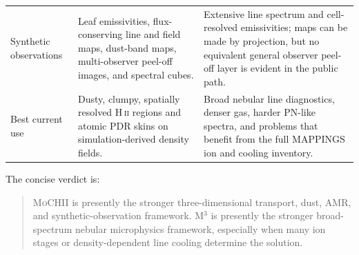 \documentclass[english,a4paper]{my_memo}
\newcommand{\MoCHII}{\textsc{MoCHII}}
\newcommand{\Mthree}{M$^3$}
\begin{document}
\begin{longtable}{P{0.19\textwidth}P{0.35\textwidth}P{0.35\textwidth}}
Synthetic observations & Leaf emissivities, flux-conserving line and field
maps, dust-band maps, multi-observer peel-off images, and spectral cubes. &
Extensive line spectrum and cell-resolved emissivities; maps can be made by
projection, but no equivalent general observer peel-off layer is evident in
the public path. \\

Best current use & Dusty, clumpy, spatially resolved H\,\textsc{ii}
regions and atomic PDR skins on simulation-derived density fields. & Broad
nebular line diagnostics, denser gas, harder PN-like spectra, and problems
that benefit from the full MAPPINGS ion and cooling inventory. \\
\end{longtable}

The concise verdict is:

\begin{quote}
\MoCHII{} is presently the stronger three-dimensional transport, dust, AMR,
and synthetic-observation framework.  \Mthree{} is presently the stronger
broad-spectrum nebular microphysics framework, especially when many ion
stages or density-dependent line cooling determine the solution.
\end{quote}
\end{document}
